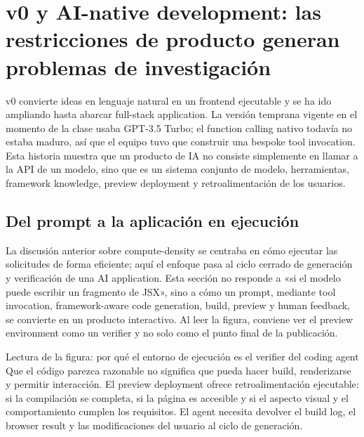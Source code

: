 \section{v0 y AI-native development: las restricciones de producto generan problemas de investigación}

v0 convierte ideas en lenguaje natural en un frontend ejecutable y se ha ido ampliando hasta abarcar full-stack application. La versión temprana vigente en el momento de la clase usaba GPT-3.5 Turbo; el function calling nativo todavía no estaba maduro, así que el equipo tuvo que construir una bespoke tool invocation. Esta historia muestra que un producto de IA no consiste simplemente en llamar a la API de un modelo, sino que es un sistema conjunto de modelo, herramientas, framework knowledge, preview deployment y retroalimentación de los usuarios.

\subsection{Del prompt a la aplicación en ejecución}

La discusión anterior sobre compute-density se centraba en cómo ejecutar las solicitudes de forma eficiente; aquí el enfoque pasa al ciclo cerrado de generación y verificación de una AI application. Esta sección no responde a «si el modelo puede escribir un fragmento de JSX», sino a cómo un prompt, mediante tool invocation, framework-aware code generation, build, preview y human feedback, se convierte en un producto interactivo. Al leer la figura, conviene ver el preview environment como un verifier y no solo como el punto final de la publicación.


\begin{knowledgebox}{Lectura de la figura: por qué el entorno de ejecución es el verifier del coding agent}
Que el código parezca razonable no significa que pueda hacer build, renderizarse y permitir interacción. El preview deployment ofrece retroalimentación ejecutable: si la compilación se completa, si la página es accesible y si el aspecto visual y el comportamiento cumplen los requisitos. El agent necesita devolver el build log, el browser result y las modificaciones del usuario al ciclo de generación.
\end{knowledgebox}


